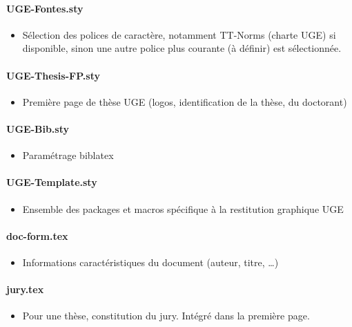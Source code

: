   \paragraph{UGE-Fontes.sty}
  \begin{itemize}
  \item Sélection des polices de caractère, notamment TT-Norms (charte UGE) si disponible, sinon une autre police plus courante (à définir) est sélectionnée.
  \end{itemize}
  
  \paragraph{UGE-Thesis-FP.sty}
\begin{itemize}
\item Première page de thèse UGE (logos, identification de la thèse, du doctorant)
\end{itemize}

  \paragraph{UGE-Bib.sty}
\begin{itemize}
\item Paramétrage biblatex
\end{itemize}

\paragraph{UGE-Template.sty}
\begin{itemize}
\item Ensemble des packages et macros spécifique à la restitution graphique UGE
\end{itemize}

\paragraph{doc-form.tex}
\begin{itemize}
\item Informations caractéristiques du document (auteur, titre, \ldots{})
\end{itemize}

\paragraph{jury.tex}
\begin{itemize}
\item Pour une thèse, constitution du jury. Intégré dans la première page.
\end{itemize}

